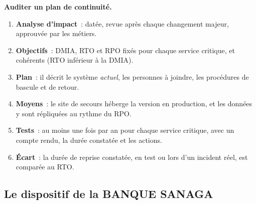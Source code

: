 \begin{boxprocedure}
\textbf{Auditer un plan de continuité.}
\begin{enumerate}
    \item \textbf{Analyse d'impact}~: datée, revue après chaque changement
          majeur, approuvée par les métiers.
    \item \textbf{Objectifs}~: DMIA, RTO et RPO fixés pour chaque service
          critique, et cohérents (RTO inférieur à la DMIA).
    \item \textbf{Plan}~: il décrit le système \emph{actuel}, les
          personnes à joindre, les procédures de bascule et de retour.
    \item \textbf{Moyens}~: le site de secours héberge la version en
          production, et les données y sont répliquées au rythme du RPO.
    \item \textbf{Tests}~: au moins une fois par an pour chaque service
          critique, avec un compte rendu, la durée constatée et les actions.
    \item \textbf{Écart}~: la durée de reprise constatée, en test ou lors
          d'un incident réel, est comparée au RTO.
\end{enumerate}
\end{boxprocedure}

\subsection{Le dispositif de la BANQUE SANAGA}

